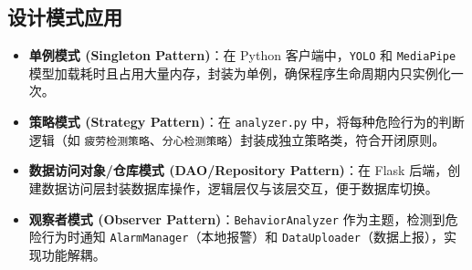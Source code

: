 \documentclass[a4paper,12pt]{article}
\begin{document}
\subsection{设计模式应用}
\begin{itemize}
  \item \textbf{单例模式 (Singleton Pattern)}：在 Python 客户端中，\texttt{YOLO} 和 \texttt{MediaPipe} 模型加载耗时且占用大量内存，封装为单例，确保程序生命周期内只实例化一次。
  \item \textbf{策略模式 (Strategy Pattern)}：在 \texttt{analyzer.py} 中，将每种危险行为的判断逻辑（如 \texttt{疲劳检测策略}、\texttt{分心检测策略}）封装成独立策略类，符合开闭原则。
  \item \textbf{数据访问对象/仓库模式 (DAO/Repository Pattern)}：在 Flask 后端，创建数据访问层封装数据库操作，逻辑层仅与该层交互，便于数据库切换。
  \item \textbf{观察者模式 (Observer Pattern)}：\texttt{BehaviorAnalyzer} 作为主题，检测到危险行为时通知 \texttt{AlarmManager}（本地报警）和 \texttt{DataUploader}（数据上报），实现功能解耦。
\end{itemize}
\end{document}
